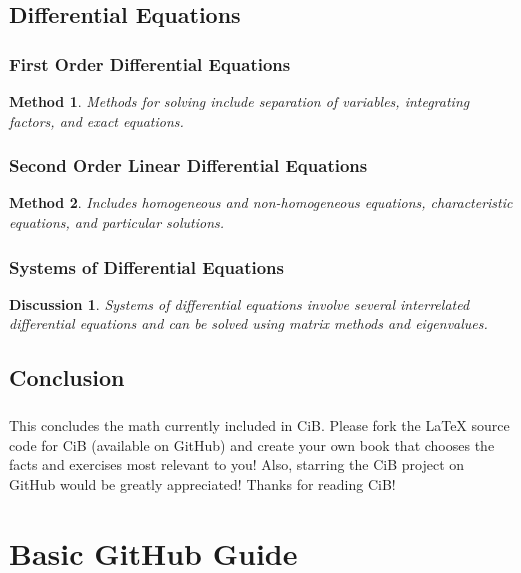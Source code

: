 \documentclass[a4paper,12pt]{book}
\newtheorem{method}{Method}
\newtheorem{discussion}{Discussion}
\begin{document}
\section{Differential Equations}
\subsection{First Order Differential Equations}
\begin{method}
Methods for solving include separation of variables, integrating factors, and exact equations.
\end{method}

\subsection{Second Order Linear Differential Equations}
\begin{method}
Includes homogeneous and non-homogeneous equations, characteristic equations, and particular solutions.
\end{method}

\subsection{Systems of Differential Equations}
\begin{discussion}
Systems of differential equations involve several interrelated differential equations and can be solved using matrix methods and eigenvalues.
\end{discussion}

\section{Conclusion}
\paragraph{}
This concludes the math currently included in CiB. Please fork the LaTeX source code for CiB (available on GitHub) and create your own book that chooses the facts and exercises most relevant to you! Also, starring the CiB project on GitHub would be greatly appreciated! Thanks for reading CiB!


\clearpage
{}
\appendix
\renewcommand{\thechapter}{\Roman{chapter}} %

\chapter{Basic GitHub Guide}
\end{document}
